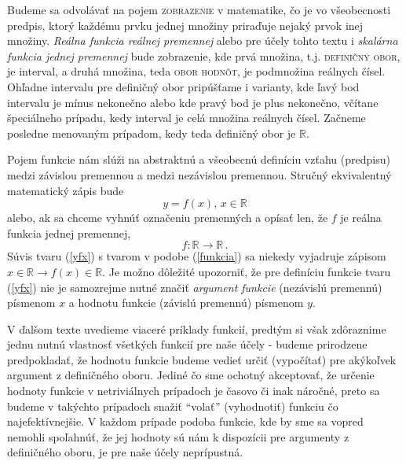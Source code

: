 
Budeme sa odvolávať na pojem \textsc{zobrazenie} v matematike, čo je vo všeobecnosti predpis, ktorý každému prvku jednej množiny priraďuje nejaký prvok inej množiny. {\it Reálna funkcia reálnej premennej} alebo pre účely tohto textu i {\it skalárna funkcia jednej premennej} bude zobrazenie, kde prvá množina, t.j. \textsc{definičný obor}, je interval, a druhá množina, teda \textsc{obor hodnôt}, je podmnožina reálnych čísel. Ohľadne intervalu pre definičný obor pripúšťame i varianty, kde ľavý bod intervalu je mínus nekonečno alebo kde pravý bod je plus nekonečno, včítane špeciálneho prípadu, kedy interval je celá množina reálnych čísel. Začneme posledne menovaným prípadom, kedy teda definičný obor je $\mathbb R$.


Pojem funkcie nám slúži na abstraktnú a všeobecnú definíciu vzťahu (predpisu) medzi závislou premennou a medzi nezávislou premennou. Stručný ekvivalentný matematický zápis bude
\begin{equation}
\label{yfx}
y = f(x), \, x \in \mathbb R
\end{equation} 
alebo, ak sa chceme vyhnúť označeniu premenných a opísať len, že $f$ je reálna funkcia jednej premennej, 
\begin{equation}
\label{funkcia}
f : \mathbb R \rightarrow \mathbb R \,.
\end{equation} 
Súvis tvaru (\ref{yfx}) s tvarom v podobe (\ref{funkcia}) sa niekedy vyjadruje zápisom $x \in \mathbb{R} \rightarrow f(x) \in \mathbb{R}$. Je možno dôležité upozorniť, že pre definíciu funkcie tvaru (\ref{yfx}) nie je samozrejme nutné značiť {\it argument funkcie} (nezávislú premennú) písmenom $x$ a hodnotu funkcie (závislú premennú) písmenom $y$. 

V ďalšom texte uvedieme viaceré príklady funkcií, predtým si však zdôraznime jednu nutnú vlastnosť všetkých funkcií pre naše účely - budeme prirodzene predpokladať, že hodnotu funkcie budeme vedieť určiť (vypočítať) pre akýkoľvek argument z definičného oboru. Jediné čo sme ochotný akceptovať, že určenie hodnoty funkcie v netriviálnych prípadoch je časovo či inak náročné, preto sa budeme v takýchto prípadoch snažiť ``volať'' (vyhodnotiť) funkciu čo najefektívnejšie. V každom prípade podoba funkcie, kde by sme sa vopred nemohli spoľahnúť, že jej hodnoty sú nám k dispozícii pre argumenty z definičného oboru, je pre naše účely neprípustná.

